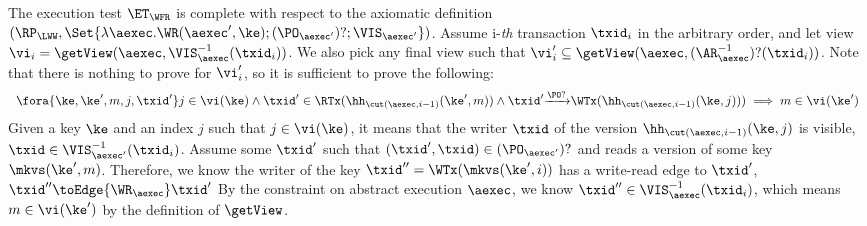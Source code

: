 The execution test $\ET_\WFR$ is complete with respect to the axiomatic definition 
\( (\RP_{\LWW}, \Set{\lambda \aexec. \WR(\aexec', \ke) ; (\PO_{\aexec'})? ; \VIS_{\aexec'} })\).
Assume i-\emph{th} transaction \( \txid_i \) in the arbitrary order,
and let view \( \vi_{i} = \getView(\aexec, \VIS^{-1}_{\aexec}(\txid_{i}) ) \).
We also pick any final view such that \( \vi'_{i} \subseteq \getView(\aexec, (\AR^{-1}_{\aexec})?(\txid_{i}) ) \).
Note that there is nothing to prove for \( \vi'_i \),
so it is sufficient to prove the following:
\[
    \begin{array}{l}
    \fora{\ke, \ke', m, j, \txid'} j \in \vi(\ke)
    \land \txid' \in \RTx(\hh_{\cut(\aexec, i-1)}(\ke', m)) \land \txid' {\xrightarrow{\PO?}} \WTx(\hh_{\cut(\aexec, i-1)}(\ke, j)) ) 
    \implies m \in \vi(\ke')
    \end{array}
\]
Given a key \( \ke \) and an index \( j \) such that \( j \in \vi(\ke) \), 
it means that the writer \( \txid \) of the version \( \hh_{\cut(\aexec, i-1)}(\ke, j) \) is visible, \ie \( \txid \in \VIS_{\aexec'}^{-1}(\txid_i) \).
Assume some \( \txid' \) such that \( (\txid', \txid) \in (\PO_{\aexec'})? \) and reads a version of some key \( \mkvs(\ke',m) \).
Therefore, we know the writer of the key \( \txid'' = \WTx(\mkvs(\ke',i)) \) has a write-read edge to \( \txid' \), \ie \( \txid'' \toEdge{\WR_\aexec} \txid'\) 
By the constraint on abstract execution \( \aexec \), we know \( \txid'' \in \VIS^{-1}_{\aexec}(\txid_{i}) \),
which means \( m \in \vi(\ke')\) by the definition of \( \getView \).
